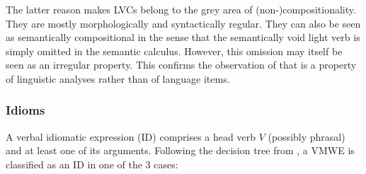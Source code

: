 \documentclass[output=paper,
modfonts,
]{langscibook}
\begin{document}
The latter reason makes LVCs belong to the grey area of (non-)com\-po\-si\-tio\-na\-li\-ty. 
They are mostly morphologically and syntactically regular. They can also be seen as semantically %
compositional in the sense that the semantically void light verb is simply omitted in the semantic calculus. However, this omission %
may itself be seen as an irregular property. This confirms the observation of \citet{Kracht07} that  is a property of linguistic analyses rather than of language items.

\subsubsection{Idioms}
\label{sec:ids}
%
A verbal idiomatic expression (ID) comprises a head verb $V$ (possibly phrasal) and at least one of its arguments. Following the decision tree from , a VMWE is classified as an ID in one of the 3 cases:
\end{document}
